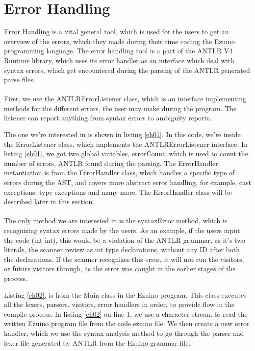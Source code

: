 \section{Error Handling}
\label{error-handling-chap}
Error Handling is a vital general tool, which is used for the users to get an overview of the errors, which they made during their time coding the Ezuino programming language. The error handling tool is a part of the ANTLR V4 Runtime library, which uses its error handler as an interface which deal with syntax errors, which get encountered during the parsing of the ANTLR generated parse files. \\
\\
First, we use the ANTLRErrorListener class, which is an interface implementing methods for the different errors, the user may make during the program. The listener can report anything from syntax errors to ambiguity reports.

\noindent\newline
The one we’re interested in is shown in listing \ref{eh01}. In this code, we’re inside the ErrorListener class, which implements the ANTLRErrorListener interface.  In listing \ref{eh01}, we got two global variables, errorCount, which is used to count the number of errors, ANTLR found during the parsing. The ErrorHandler instantiation is from the ErrorHandler class, which handles a specific type of errors during the AST, and covers more abstract error handling, for example, cast exceptions, type exceptions and many more. The ErrorHandler class will be described later in this section. \\
\\
The only method we are interested in is the syntaxError method, which is recognizing syntax errors made by the users. As an example, if the users input the code (int int), this would be a violation of the ANTLR grammar, as it’s two literals, the scanner review as int type declarations, without any ID after both the declarations. If the scanner recognizes this error, it will not run the visitors, or future visitors through, as the error was caught in the earlier stages of the process.

\noindent\newline
Listing \ref{eh02}, is from the Main class in the Ezuino program. This class executes all the lexers, parsers, visitors, error handlers in order, to provide flow in the compile process. In listing \ref{eh02} on line 1, we use a character stream to read the written Ezuino program file from the code.ezuino file. We then create a new error handler, which we use the syntax analysis method to go through the parser and lexer file generated by ANTLR from the Ezuino grammar file. \\
